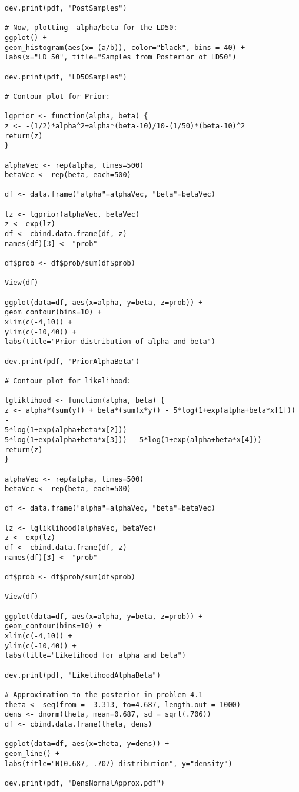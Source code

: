 \documentclass[12pt]{article}
\begin{document}
\begin{Verbatim}
dev.print(pdf, "PostSamples")

# Now, plotting -alpha/beta for the LD50:
ggplot() + 
geom_histogram(aes(x=-(a/b)), color="black", bins = 40) +
labs(x="LD 50", title="Samples from Posterior of LD50")

dev.print(pdf, "LD50Samples")

# Contour plot for Prior:

lgprior <- function(alpha, beta) {
z <- -(1/2)*alpha^2+alpha*(beta-10)/10-(1/50)*(beta-10)^2
return(z)
}

alphaVec <- rep(alpha, times=500)
betaVec <- rep(beta, each=500)

df <- data.frame("alpha"=alphaVec, "beta"=betaVec)

lz <- lgprior(alphaVec, betaVec)
z <- exp(lz)
df <- cbind.data.frame(df, z)
names(df)[3] <- "prob"

df$prob <- df$prob/sum(df$prob)

View(df)

ggplot(data=df, aes(x=alpha, y=beta, z=prob)) +
geom_contour(bins=10) +
xlim(c(-4,10)) + 
ylim(c(-10,40)) +
labs(title="Prior distribution of alpha and beta")

dev.print(pdf, "PriorAlphaBeta")

# Contour plot for likelihood:

lgliklihood <- function(alpha, beta) {
z <- alpha*(sum(y)) + beta*(sum(x*y)) - 5*log(1+exp(alpha+beta*x[1])) - 
5*log(1+exp(alpha+beta*x[2])) - 
5*log(1+exp(alpha+beta*x[3])) - 5*log(1+exp(alpha+beta*x[4]))
return(z)
}

alphaVec <- rep(alpha, times=500)
betaVec <- rep(beta, each=500)

df <- data.frame("alpha"=alphaVec, "beta"=betaVec)

lz <- lgliklihood(alphaVec, betaVec)
z <- exp(lz)
df <- cbind.data.frame(df, z)
names(df)[3] <- "prob"

df$prob <- df$prob/sum(df$prob)

View(df)

ggplot(data=df, aes(x=alpha, y=beta, z=prob)) +
geom_contour(bins=10) +
xlim(c(-4,10)) + 
ylim(c(-10,40)) +
labs(title="Likelihood for alpha and beta")

dev.print(pdf, "LikelihoodAlphaBeta")

# Approximation to the posterior in problem 4.1
theta <- seq(from = -3.313, to=4.687, length.out = 1000)
dens <- dnorm(theta, mean=0.687, sd = sqrt(.706))
df <- cbind.data.frame(theta, dens)

ggplot(data=df, aes(x=theta, y=dens)) +
geom_line() +
labs(title="N(0.687, .707) distribution", y="density")

dev.print(pdf, "DensNormalApprox.pdf")
\end{Verbatim}
\end{document}
